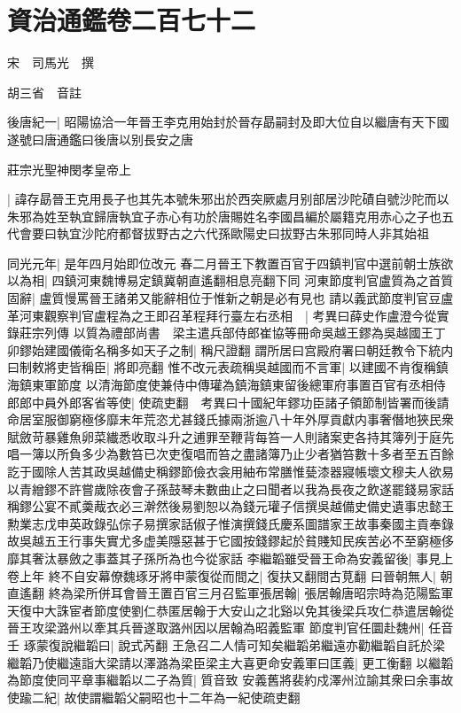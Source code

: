 \section{資治通鑑卷二百七十二}
宋　司馬光　撰

胡三省　音註

後唐紀一|{
	昭陽協洽一年晉王李克用始封於晉存勗嗣封及即大位自以繼唐有天下國遂號曰唐通鑑曰後唐以别長安之唐}


莊宗光聖神閔孝皇帝上

|{
	諱存勗晉王克用長子也其先本號朱邪出於西突厥處月别部居沙陀磧自號沙陀而以朱邪為姓至執宜歸唐執宜子赤心有功於唐賜姓名李國昌編於屬籍克用赤心之子也五代會要曰執宜沙陀府都督拔野古之六代孫歐陽史曰拔野古朱邪同時人非其始祖}


同光元年|{
	是年四月始即位改元}
春二月晉王下教置百官于四鎮判官中選前朝士族欲以為相|{
	四鎮河東魏博易定鎮冀朝直遙翻相息亮翻下同}
河東節度判官盧質為之首質固辭|{
	盧質慢罵晉王諸弟又能辭相位于惟新之朝是必有見也}
請以義武節度判官豆盧革河東觀察判官盧程為之王即召革程拜行臺左右丞相　|{
	考異曰薛史作盧澄今從實錄莊宗列傳}
以質為禮部尚書　梁主遣兵部侍郎崔協等冊命吳越王鏐為吳越國王丁卯鏐始建國儀衛名稱多如天子之制|{
	稱尺證翻}
謂所居曰宫殿府署曰朝廷教令下統内曰制敕將吏皆稱臣|{
	將即亮翻}
惟不改元表疏稱吳越國而不言軍|{
	以建國不肯復稱鎮海鎮東軍節度}
以清海節度使兼侍中傳瓘為鎮海鎮東留後總軍府事置百官有丞相侍郎郎中員外郎客省等使|{
	使疏吏翻　考異曰十國紀年鏐功臣諸子領節制皆署而後請命居室服御窮極侈靡末年荒恣尤甚錢氏據兩浙逾八十年外厚貢獻内事奢僭地狹民衆賦斂苛暴雞魚卵菜纎悉收取斗升之逋罪至鞭背每笞一人則諸案吏各持其簿列于庭先唱一簿以所負多少為數笞已次吏復唱而笞之盡諸簿乃止少者猶笞數十多者至五百餘訖于國除人苦其政吳越備史稱鏐節儉衣衾用紬布常膳惟甆漆器寢帳壞文穆夫人欲易以青繒鏐不許嘗歲除夜會子孫鼓琴未數曲止之曰聞者以我為長夜之飲遂罷錢易家話稱鏐公宴不貳羮胾衣必三澣然後易劉恕以為錢元瓘子信撰吳越備史備史遺事忠懿王勲業志戊申英政錄弘倧子易撰家話俶子惟演撰錢氏慶系圖譜家王故事秦國主貢奉錄故吳越五王行事失實尤多虚美隱惡甚于它國按錢鏐起於貧賤知民疾苦必不至窮極侈靡其奢汰暴斂之事蓋其子孫所為也今從家話}
李繼韜雖受晉王命為安義留後|{
	事見上卷上年}
終不自安幕僚魏琢牙將申蒙復從而間之|{
	復扶又翻間古莧翻}
曰晉朝無人|{
	朝直遙翻}
終為梁所併耳會晉王置百官三月召監軍張居翰|{
	張居翰唐昭宗時為范陽監軍天復中大誅宦者節度使劉仁恭匿居翰于大安山之北谿以免其後梁兵攻仁恭遣居翰從晉王攻梁潞州以牽其兵晉遂取潞州因以居翰為昭義監軍}
節度判官任圜赴魏州|{
	任音壬}
琢蒙復說繼韜曰|{
	說式芮翻}
王急召二人情可知矣繼韜弟繼遠亦勸繼韜自託於梁繼韜乃使繼遠詣大梁請以澤潞為梁臣梁主大喜更命安義軍曰匡義|{
	更工衡翻}
以繼韜為節度使同平章事繼韜以二子為質|{
	質音致}
安義舊將裴約戍澤州泣諭其衆曰余事故使踰二紀|{
	故使謂繼韜父嗣昭也十二年為一紀使疏吏翻}
